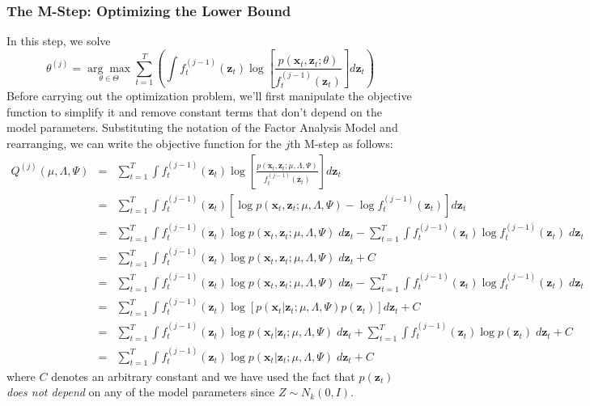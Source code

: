 \documentclass[12pt]{article}
\theoremstyle{definition}
\begin{document}
\subsubsection{The M-Step: Optimizing the Lower Bound}
In this step, we solve 
	$$\displaystyle\theta^{(j)} = \underset{\theta \in \Theta}{\arg \max} \sum_{t = 1}^T  \left(\int f_t^{(j-1)}(\mathbf{z}_t) \log\left[\frac{p(\textbf{x}_t,\textbf{z}_t;\theta)}{f_t^{(j-1)}(\mathbf{z}_t)}\right] d \textbf{z}_t \right)$$
Before carrying out the optimization problem, we'll first manipulate the objective function to simplify it and remove constant terms that don't depend on the model parameters. Substituting the notation of the Factor Analysis Model and rearranging, we can write the objective function for the $j$th M-step as follows:
	\begin{eqnarray*}
		Q^{(j)}(\mu, \Lambda, \Psi) &=& \sum_{t=1}^T \int f_t^{(j-1)}(\textbf{z}_t) \log \left[ \frac{p(\textbf{x}_t, \textbf{z}_t;\mu, \Lambda, \Psi)}{f_t^{(j-1)}(\textbf{z}_t)}\right] d \textbf{z}_t\\
			&=&	\sum_{t=1}^T \int f_t^{(j-1)}(\textbf{z}_t) \left[\log p(\textbf{x}_t, \textbf{z}_t;\mu, \Lambda, \Psi) - \log f_t^{(j-1)}(\textbf{z}_t)\right] d \textbf{z}_t\\
		&=&\sum_{t=1}^T \int f_t^{(j-1)}(\textbf{z}_t) \log p(\textbf{x}_t, \textbf{z}_t;\mu, \Lambda, \Psi)\;d \textbf{z}_t -\sum_{t=1}^T  \int f_t^{(j-1)}(\textbf{z}_t) \log f_t^{(j-1)}(\textbf{z}_t) \;d \textbf{z}_t\\
		&=&\sum_{t=1}^T \int f_t^{(j-1)}(\textbf{z}_t) \log p(\textbf{x}_t, \textbf{z}_t;\mu, \Lambda, \Psi)\;d \textbf{z}_t  + C\\
		&=& \sum_{t=1}^T \int f_t^{(j-1)}(\textbf{z}_t) \log p(\textbf{x}_t, \textbf{z}_t;\mu, \Lambda, \Psi)\;d \textbf{z}_t -\sum_{t=1}^T  \int f_t^{(j-1)}(\textbf{z}_t) \log f_t^{(j-1)}(\textbf{z}_t) \;d \textbf{z}_t\\
		&=&\sum_{t=1}^T \int f_t^{(j-1)}(\textbf{z}_t) \log\left[ p(\textbf{x}_t| \textbf{z}_t;\mu, \Lambda, \Psi)p(\textbf{z}_t) \right]d \textbf{z}_t  + C\\
		&=&\sum_{t=1}^T \int f_t^{(j-1)}(\textbf{z}_t) \log p(\textbf{x}_t| \textbf{z}_t;\mu, \Lambda, \Psi)\;d \textbf{z}_t + \sum_{t=1}^T \int f_t^{(j-1)}(\textbf{z}_t)\log p(\textbf{z}_t)\; d \mathbf{z}_t + C\\
		&=& \sum_{t=1}^T \int f_t^{(j-1)}(\textbf{z}_t) \log p(\textbf{x}_t| \textbf{z}_t;\mu, \Lambda, \Psi)\;d \textbf{z}_t + C
	\end{eqnarray*} 
where $C$ denotes an arbitrary constant and we have used the fact that $p(\mathbf{z}_t)$ \emph{does not depend} on any of the model parameters since $Z \sim N_k(0, I)$. 
\end{document}
